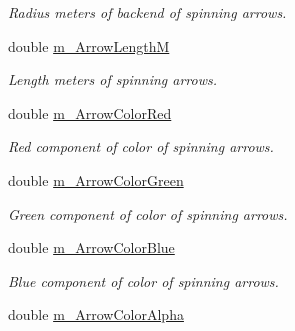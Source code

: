 \begin{DoxyCompactItemize}
\begin{DoxyCompactList}\small\item\em Radius meters of backend of spinning arrows. \end{DoxyCompactList}\item 
\hypertarget{class_circular_orbit_belief_a46b7fdc499ebe7eee08f3d14371a329b}{
double \hyperlink{class_circular_orbit_belief_a46b7fdc499ebe7eee08f3d14371a329b}{m\_\-ArrowLengthM}}
\label{class_circular_orbit_belief_a46b7fdc499ebe7eee08f3d14371a329b}

\begin{DoxyCompactList}\small\item\em Length meters of spinning arrows. \end{DoxyCompactList}\item 
\hypertarget{class_circular_orbit_belief_a98bef3a1d8fa3d6f43f6be7ffeb16e89}{
double \hyperlink{class_circular_orbit_belief_a98bef3a1d8fa3d6f43f6be7ffeb16e89}{m\_\-ArrowColorRed}}
\label{class_circular_orbit_belief_a98bef3a1d8fa3d6f43f6be7ffeb16e89}

\begin{DoxyCompactList}\small\item\em Red component of color of spinning arrows. \end{DoxyCompactList}\item 
\hypertarget{class_circular_orbit_belief_ad91a90879b92838b48e0cfec62a99e95}{
double \hyperlink{class_circular_orbit_belief_ad91a90879b92838b48e0cfec62a99e95}{m\_\-ArrowColorGreen}}
\label{class_circular_orbit_belief_ad91a90879b92838b48e0cfec62a99e95}

\begin{DoxyCompactList}\small\item\em Green component of color of spinning arrows. \end{DoxyCompactList}\item 
\hypertarget{class_circular_orbit_belief_afe5a7b90326b6c8208e7fd6095aff985}{
double \hyperlink{class_circular_orbit_belief_afe5a7b90326b6c8208e7fd6095aff985}{m\_\-ArrowColorBlue}}
\label{class_circular_orbit_belief_afe5a7b90326b6c8208e7fd6095aff985}

\begin{DoxyCompactList}\small\item\em Blue component of color of spinning arrows. \end{DoxyCompactList}\item 
\hypertarget{class_circular_orbit_belief_a68ac9ec66c2a89fe52300996d37b126f}{
double \hyperlink{class_circular_orbit_belief_a68ac9ec66c2a89fe52300996d37b126f}{m\_\-ArrowColorAlpha}}
\label{class_circular_orbit_belief_a68ac9ec66c2a89fe52300996d37b126f}


\end{DoxyCompactItemize}
